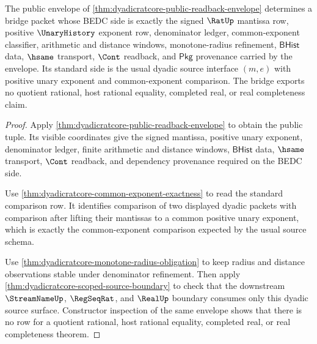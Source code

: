 \begin{theorem}
\label{thm:dyadicratcore-standard-source-bridge}
The public envelope of \autoref{thm:dyadicratcore-public-readback-envelope}
determines a bridge packet whose BEDC side is exactly the signed $\RatUp$
mantissa row, positive $\UnaryHistory$ exponent row, denominator ledger,
common-exponent classifier, arithmetic and distance windows, monotone-radius
refinement, $\mathsf{BHist}$ data, $\hsame$ transport, $\Cont$ readback, and
$\mathsf{Pkg}$ provenance carried by the envelope. Its standard side is the
usual dyadic source interface $(m,e)$ with positive unary exponent and
common-exponent comparison. The bridge exports no quotient rational, host
rational equality, completed real, or real completeness claim.
\end{theorem}
\begin{proof}
Apply \autoref{thm:dyadicratcore-public-readback-envelope} to obtain the
public tuple. Its visible coordinates give the signed mantissa, positive unary
exponent, denominator ledger, finite arithmetic and distance windows,
$\mathsf{BHist}$ data, $\hsame$ transport, $\Cont$ readback, and dependency
provenance required on the BEDC side.

Use \autoref{thm:dyadicratcore-common-exponent-exactness} to read the standard
comparison row. It identifies comparison of two displayed dyadic packets with
comparison after lifting their mantissas to a common positive unary exponent,
which is exactly the common-exponent comparison expected by the usual source
schema.

Use \autoref{thm:dyadicratcore-monotone-radius-obligation} to keep radius and
distance observations stable under denominator refinement. Then apply
\autoref{thm:dyadicratcore-scoped-source-boundary} to check that the downstream
$\StreamNameUp$, $\RegSeqRat$, and $\RealUp$ boundary consumes only this
dyadic source surface. Constructor inspection of the same envelope shows that
there is no row for a quotient rational, host rational equality, completed
real, or real completeness theorem.
\end{proof}

